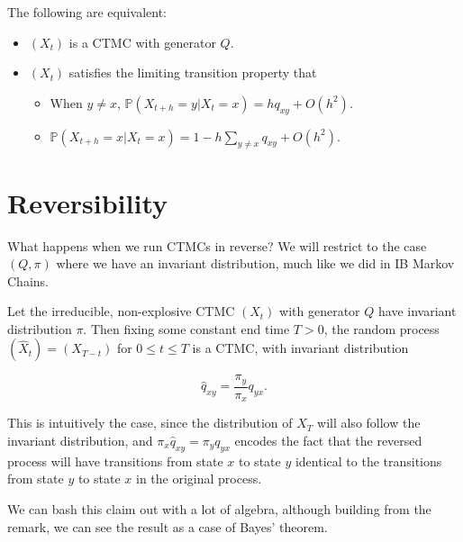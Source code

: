 \documentclass[11pt]{scrartcl}
\begin{document}
\begin{theorem}
\label{CTMC TFAE}
The following are equivalent:

\begin{itemize}
\item $(X_t)$ is a CTMC with generator $Q$.
\item $(X_t)$ satisfies the limiting transition property that 
\begin{itemize}
    \item When $y \neq x$, $\mathbb{ P}(X_{t+h} = y | X_t = x) = h q_{xy} + O(h^2)$.
    \item $\mathbb{ P}( X_{t+h} = x | X_t = x ) = 1 - h\sum_{y \neq x} q_{xy} + O(h^2)$.
\end{itemize}
\end{itemize}

\end{theorem}

\section{Reversibility}

What happens when we run CTMCs in reverse? We will restrict to the case $(Q, \pi)$ where we have an invariant distribution, much like we did in IB Markov Chains.

\begin{theorem}[Reversibility]
Let the irreducible, non-explosive CTMC $(X_t)$ with generator $Q$ have invariant distribution $\pi $. Then fixing some constant end time $T>0$, the random process $(\hat{X}_t) = (X_{T-t})$ for $0 \le t \le T$ is a CTMC, with invariant distribution 

\begin{equation}
    \hat{q}_{xy} = \frac{\pi_y}{\pi_x} q_{yx}.
\end{equation}
\end{theorem}

\begin{remark}
This is intuitively the case, since the distribution of $X_T$ will also follow the invariant distribution, and $\pi_x \hat{q}_{xy} = \pi_y q_{yx}$ encodes the fact that the reversed process will have transitions from state $x$ to state $y$ identical to the transitions from state $y$ to state $x$ in the original process. 
\end{remark}

We can bash this claim out with a lot of algebra, although building from the remark, we can see the result as a case of Bayes' theorem.
\end{document}
